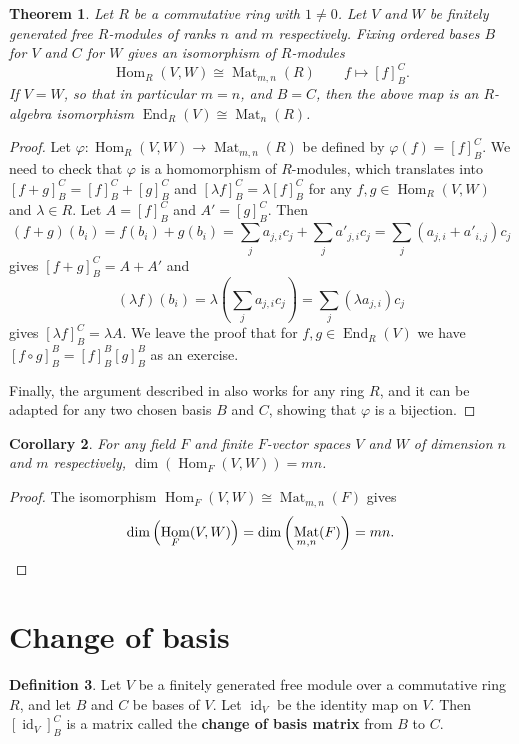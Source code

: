 \documentclass[12pt]{report}
\newtheorem{theorem}{Theorem}[chapter]
\newtheorem{corollary}[theorem]{Corollary}
\numberwithin{equation}{section}
\numberwithin{theorem}{chapter}
\theoremstyle{definition}
\newtheorem{definition}[theorem]{Definition}
\newtheorem*{basic properties}{Basic Properties}
\newtheorem*{Important Remark}{Important Remark}
\newcommand{\df}[1]{{\bf #1}\index{#1}}
\DeclareMathOperator{\id}{id}
\DeclareMathOperator{\End}{End}
\DeclareMathOperator{\Hom}{Hom}
\DeclareMathOperator{\M}{Mat}
\begin{document}
\begin{theorem}
\label{prop:hommat}
Let $R$ be a commutative ring with $1\neq 0$. Let $V$ and $W$ be finitely generated free $R$-modules of ranks $n$ and $m$ respectively. Fixing ordered bases $B$ for $V$ and $C$ for $W$ gives an isomorphism of $R$-modules
$$\Hom_R(V, W) \cong \M_{m,n}(R) \qquad f\mapsto [f]_B^C.$$
If $V=W$, so that in particular $m=n$, and $B=C$, then the above map is an $R$-algebra isomorphism $\End_R(V)\cong\M_n(R)$.
\end{theorem}
 
\begin{proof}
Let $\varphi\!:\Hom_R(V, W) \to \M_{m,n}(R)$ be defined by $\varphi(f)=[f]_B^C$. 
We need to check that $\varphi$ is a homomorphism of $R$-modules, which translates into $[f+g]_B^C=[f]_B^C+[g]_B^C$ and $[\lambda f]_B^C=\lambda[f]_B^C$ for any $f,g \in \Hom_R(V, W)$ and $\lambda\in R$. 
Let $A=[f]_B^C$ and $A'=[g]_B^C$. Then 
$$(f+g)(b_i)=f(b_i)+g(b_i)= \sum_j a_{j,i} c_j+ \sum_j a'_{j,i} c_j= \sum_j (a_{j,i}+a'_{i,j}) c_j$$
gives $[f+g]_B^C=A+A'$ and
$$(\lambda f)(b_i)=\lambda\left( \sum_j a_{j,i} c_j\right)= \sum_j (\lambda a_{j,i}) c_j$$
gives $[\lambda f]_B^C=\lambda A$.
We leave the proof that for $f,g\in \End_R(V)$ we have $[f\circ g]_B^B=[f]_B^B[g]_B^B$ as an exercise.

Finally, the argument described in  also works for any ring $R$, and it can be adapted for any two chosen basis $B$ and $C$, showing that $\varphi$ is a bijection.
\end{proof}



\begin{corollary}
For any field $F$ and finite $F$-vector spaces $V$ and $W$ of dimension $n$ and $m$ respectively, $\dim(\Hom_F(V, W))=mn$.
\end{corollary}

\begin{proof}
The isomorphism $\Hom_F(V, W) \cong \M_{m,n}(F)$ gives 
$$\dim \left(\Hom_F(V, W) \right) = \dim \left( \M_{m,n}(F) \right)=mn.\qedhere$$ 
\end{proof}
 



\section{Change of basis}
 

\begin{definition}
Let $V$ be a finitely generated free module over a commutative ring $R$, and let $B$ and $C$ be bases of $V$. Let $\id_V$ be the identity map on $V$. Then $[\id_V]_B^{C}$ is a matrix called the \df{change of basis matrix} from $B$ to $C$.
\end{definition}
 
\end{document}
